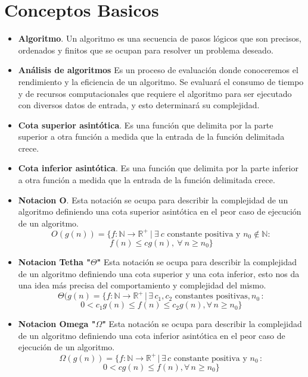 \documentclass[12pt,twoside]{article}
\begin{document}
\newpage


\newpage
\section{Conceptos Basicos}

\begin{itemize}
\item \textbf{Algoritmo}. Un algoritmo es una secuencia de pasos lógicos que son precisos, ordenados y finitos que se ocupan para resolver un problema deseado\cite{concep1}.

\item \textbf{Análisis de  algoritmos}
Es un proceso de evaluación donde conoceremos el rendimiento y la eficiencia de un algoritmo. Se evaluará el consumo de tiempo y de recursos computacionales que requiere el algoritmo para ser ejecutado con diversos datos de entrada, y esto determinará su complejidad\cite{concep1}.

\item \textbf{Cota superior asintótica}. Es una función que delimita por la parte superior a otra función a medida que la entrada de la función delimitada crece.

\item \textbf{Cota inferior asintótica}. Es una función que delimita por la parte inferior a otra función a medida que la entrada de la función delimitada crece.

\item \textbf{Notacion O}. Esta notación se ocupa para describir la complejidad de un algoritmo definiendo una cota superior asintótica en el peor caso de ejecución de un algoritmo\cite{concep1}.
\\
\[O(g(n)) = \{ f : \mathbb{N} \rightarrow \mathbb{R}^+ \ | \ \exists \ c \text{ constante positiva y } n_0 \notin \mathbb{N} :\] 
\[f(n) \leq cg(n), \ \forall \ n \geq n_0 \}\]

\item \textbf{Notacion Tetha "$\Theta$"} Esta notación se ocupa para describir la complejidad de un algoritmo definiendo una cota superior y una cota inferior, esto nos da una idea más precisa del comportamiento y complejidad del mismo\cite{concep1}.
\\
\[\Theta(g(n) = \{f : \mathbb{N} \rightarrow \mathbb{R}^+ \,|\, \exists \, c_1, c_2 \text{ constantes positivas}, n_0 \,: \]
\[0 < c_1g(n) \leq f(n) \leq c_2g(n), \forall \, n \geq n_0\}\]

\item \textbf{Notacion Omega "$\Omega$"}  Esta notación se ocupa para describir la complejidad de un algoritmo definiendo una cota inferior asintótica en el peor caso de ejecución de un algoritmo\cite{concep1}.
\\
\[\Omega(g(n)) = \{f : \mathbb{N} \rightarrow \mathbb{R}^+ \,|\, \exists \, c \text{ constante positiva y } n_0 \,:\]
\[0 < cg(n) \leq f(n), \forall \, n \geq n_0\}\]



\end{itemize}
\end{document}
